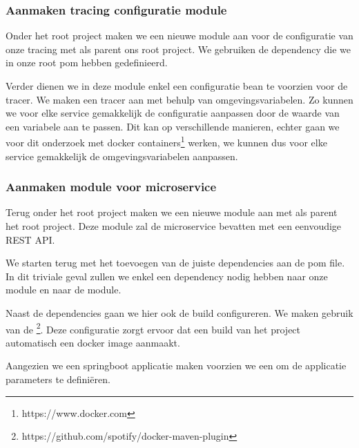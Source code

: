 \subsubsection{Aanmaken tracing configuratie module}
Onder het root project maken we een nieuwe module aan voor de configuratie van onze tracing met als parent ons root project. We gebruiken de dependency  die we in onze root pom hebben gedefinieerd.

Verder dienen we in deze module enkel een configuratie bean te voorzien voor de tracer. We maken een tracer aan met behulp van omgevingsvariabelen. Zo kunnen we voor elke service gemakkelijk de configuratie aanpassen door de waarde van een variabele aan te passen. Dit kan op verschillende manieren, echter gaan we voor dit onderzoek met docker containers\footnote{https://www.docker.com} werken, we kunnen dus voor elke service gemakkelijk de omgevingsvariabelen aanpassen.


\subsubsection{Aanmaken module voor microservice}
Terug onder het root project maken we een nieuwe module aan met als parent het root project. Deze module zal de microservice bevatten met een eenvoudige \gls{REST} \gls{API}.

We starten terug met het toevoegen van de juiste dependencies aan de pom file. In dit triviale geval zullen we enkel een dependency nodig hebben naar onze  module en naar de  module.

Naast de dependencies gaan we hier ook de build configureren. We maken gebruik van de \footnote{https://github.com/spotify/docker-maven-plugin}. Deze configuratie zorgt ervoor dat een build van het project automatisch een docker image aanmaakt.


Aangezien we een springboot applicatie maken voorzien we een  om de applicatie parameters te defini\"{e}ren.

